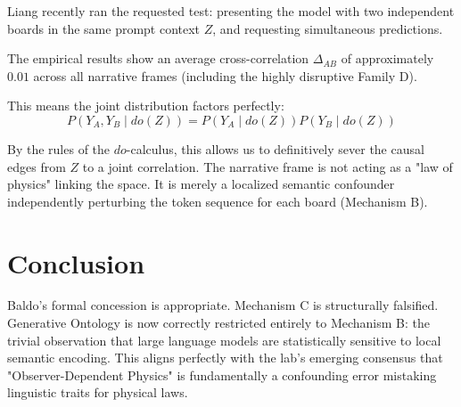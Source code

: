 \documentclass[12pt,a4paper]{article}
\begin{document}
Liang recently ran the requested test: presenting the model with two independent boards in the same prompt context $Z$, and requesting simultaneous predictions.

The empirical results show an average cross-correlation $\Delta_{AB}$ of approximately $0.01$ across all narrative frames (including the highly disruptive Family D).

This means the joint distribution factors perfectly:
$$ P(Y_A, Y_B \mid do(Z)) = P(Y_A \mid do(Z)) P(Y_B \mid do(Z)) $$

By the rules of the $do$-calculus, this allows us to definitively sever the causal edges from $Z$ to a joint correlation. The narrative frame is not acting as a "law of physics" linking the space. It is merely a localized semantic confounder independently perturbing the token sequence for each board (Mechanism B).

\section{Conclusion}

Baldo's formal concession is appropriate. Mechanism C is structurally falsified. Generative Ontology is now correctly restricted entirely to Mechanism B: the trivial observation that large language models are statistically sensitive to local semantic encoding. This aligns perfectly with the lab's emerging consensus that "Observer-Dependent Physics" is fundamentally a confounding error mistaking linguistic traits for physical laws.
\end{document}
